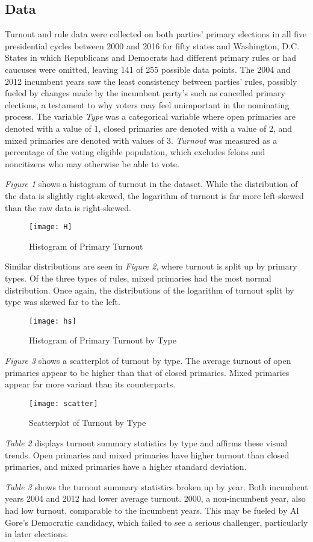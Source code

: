 \documentclass[12pt]{article}
\begin{document}
\begin{doublespace}
	\subsection*{Data}
	Turnout and rule data were collected on both parties' primary elections in all five presidential cycles between 2000 and 2016 for fifty states and Washington, D.C. States in which Republicans and Democrats had different primary rules or had caucuses were omitted, leaving 141 of 255 possible data points. The 2004 and 2012 incumbent years saw the least consistency between parties' rules, possibly fueled by changes made by the incumbent party's such as cancelled primary elections, a testament to why voters may feel unimportant in the nominating process. The variable \textit{Type} was a categorical variable where open primaries are denoted with a value of 1, closed primaries are denoted with a value of 2, and mixed primaries are denoted with values of 3. \textit{Turnout} was measured as a percentage of the voting eligible population, which excludes felons and noncitizens who may otherwise be able to vote.
	\par
	\textit{Figure 1} shows a histogram of turnout in the dataset. While the distribution of the data is slightly right-skewed, the logarithm of turnout is far more left-skewed than the raw data is right-skewed. 
	\begin{figure}[H]
		\texttt{[image: H]}
		\caption{Histogram of Primary Turnout}
		\label{fig:figure1}
	\end{figure}
	Similar distributions are seen in \textit{Figure 2}, where turnout is split up by primary types. Of the three types of rules, mixed primaries had the most normal distribution. Once again, the distributions of the logarithm of turnout split by type was skewed far to the left.
	\begin{figure}[H]
		\texttt{[image: hs]}
		\caption{Histogram of Primary Turnout by Type}
		\label{fig:figure2}
	\end{figure}
	\textit{Figure 3} shows a scatterplot of turnout by type. The average turnout of open primaries appear to be higher than that of closed primaries. Mixed primaries appear far more variant than its counterparts. 
		\begin{figure}[H]
			\texttt{[image: scatter]}
			\caption{Scatterplot of Turnout by Type}
			\label{fig:figure3}
		\end{figure}
	\textit{Table 2} displays turnout summary statistics by type and affirms these visual trends. Open primaries and mixed primaries have higher turnout than closed primaries, and mixed primaries have a higher standard deviation. \par
	\textit{Table 3} shows the turnout summary statistics broken up by year. Both incumbent years 2004 and 2012 had lower average turnout. 2000, a non-incumbent year, also had low turnout, comparable to the incumbent years. This may be fueled by Al Gore's Democratic candidacy, which failed to see a serious challenger, particularly in later elections.
		\end{doublespace}
\end{document}

